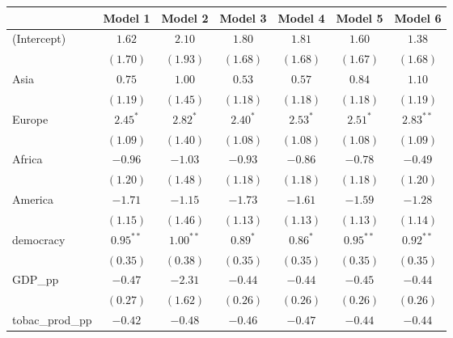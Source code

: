
\begin{table}[!h]
\begin{center}
\begin{tabular}{l c c c c c c }
\toprule
 & Model 1 & Model 2 & Model 3 & Model 4 & Model 5 & Model 6 \\
\midrule
(Intercept)             & $1.62$       & $2.10$       & $1.80$       & $1.81$       & $1.60$       & $1.38$       \\
                        & $(1.70)$     & $(1.93)$     & $(1.68)$     & $(1.68)$     & $(1.67)$     & $(1.68)$     \\
Asia                    & $0.75$       & $1.00$       & $0.53$       & $0.57$       & $0.84$       & $1.10$       \\
                        & $(1.19)$     & $(1.45)$     & $(1.18)$     & $(1.18)$     & $(1.18)$     & $(1.19)$     \\
Europe                  & $2.45^{*}$   & $2.82^{*}$   & $2.40^{*}$   & $2.53^{*}$   & $2.51^{*}$   & $2.83^{**}$  \\
                        & $(1.09)$     & $(1.40)$     & $(1.08)$     & $(1.08)$     & $(1.08)$     & $(1.09)$     \\
Africa                  & $-0.96$      & $-1.03$      & $-0.93$      & $-0.86$      & $-0.78$      & $-0.49$      \\
                        & $(1.20)$     & $(1.48)$     & $(1.18)$     & $(1.18)$     & $(1.18)$     & $(1.20)$     \\
America                 & $-1.71$      & $-1.15$      & $-1.73$      & $-1.61$      & $-1.59$      & $-1.28$      \\
                        & $(1.15)$     & $(1.46)$     & $(1.13)$     & $(1.13)$     & $(1.13)$     & $(1.14)$     \\
democracy               & $0.95^{**}$  & $1.00^{**}$  & $0.89^{*}$   & $0.86^{*}$   & $0.95^{**}$  & $0.92^{**}$  \\
                        & $(0.35)$     & $(0.38)$     & $(0.35)$     & $(0.35)$     & $(0.35)$     & $(0.35)$     \\
GDP\_pp                 & $-0.47$      & $-2.31$      & $-0.44$      & $-0.44$      & $-0.45$      & $-0.44$      \\
                        & $(0.27)$     & $(1.62)$     & $(0.26)$     & $(0.26)$     & $(0.26)$     & $(0.26)$     \\
tobac\_prod\_pp         & $-0.42$      & $-0.48$      & $-0.46$      & $-0.47$      & $-0.44$      & $-0.44$      \\

\end{tabular}
\end{center}
\end{table}
